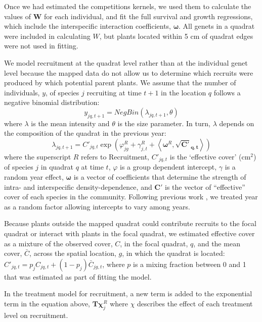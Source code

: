 \documentclass[11pt]{article}
\begin{document}
\begin{doublespace}
Once we had estimated the competitions kernels, we used them to calculate the values of $\boldsymbol{W}$ for each individual, and fit the full survival and growth regressions, which include the interspecific interaction coefficients, $\boldsymbol{\omega}$. 
All genets in a quadrat were included in calculating $W$, but plants located within 5 cm of quadrat edges were not used in fitting. 

We model recruitment at the quadrat level rather than at the individual genet level because the mapped data do not allow us to determine which recruits were produced by which potential parent plants. We assume that the number of individuals, $y$, of species $j$ recruiting at time $t+1$ in the location $q$ follows a negative binomial distribution:
\begin{equation}
y_{jq,t+1}= NegBin(\lambda_{jq,t+1},\theta) 	   
\label{eqn:recrDataModel}
\end{equation}
where $\lambda$ is the mean intensity and $\theta$ is the size parameter. In turn, $\lambda$ depends on the composition of the quadrat in the previous year:
\begin{equation}
\lambda_{jq,t+1} = C'_{jq,t} \exp{\left(\varphi_{jg}^R + \gamma_{j,t}^R + 
\left \langle \boldsymbol{\omega}^R , \boldsymbol{\sqrt{C'}_{q,t}} \right \rangle \right) }
\label{eqn:recrProcessModel}
\end{equation}
where the superscript $R$ refers to Recruitment, $C'_{jq,t}$ is the `effective cover' (cm$^2$) of species $j$ in quadrat $q$ at time $t$, $\varphi$ is a group dependent intercept, $\gamma$ is a random year effect, $\boldsymbol{\omega}$ is a vector of coefficients that determine the strength of intra- and interspecific density-dependence, and $\boldsymbol{C'}$ is the vector of ``effective'' cover of each species in the community. Following previous work \citep{adler_coexistence_2010}, we treated year as a random factor allowing intercepts to vary among years. 
   
Because plants outside the mapped quadrat could contribute recruits to the focal quadrat or interact with plants in the focal quadrat, we estimated effective cover as a mixture of the observed cover, $C$, in the focal quadrat, $q$, and the mean cover, $\bar{C}$, across the spatial location, $g$, in which the quadrat is located: $C'_{jq,t}=p_j C_{jq,t}+(1-p_j) \bar{C}_{jg,t}$, where $p$ is a mixing fraction between 0 and 1 that was estimated as part of fitting the model.

In the treatment model for recruitment, a new term is added to the exponential term in the equation above, $\boldsymbol{T}\boldsymbol{\chi}_{j}^R$ where $\chi$ describes the effect of each treatment level on recruitment.


\end{doublespace}
\end{document}

